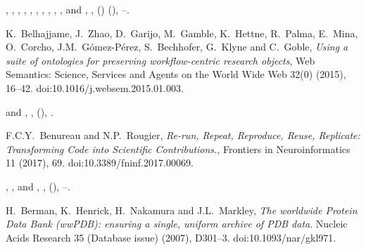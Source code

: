 \documentclass[ds,v1.1.2,openaccess]{iosart2x}%
\begin{document}
\begin{thebibliography}{}
%
\begin{barticle}
,
,
,
,
,
,
,
,
,
,
 and
,
,
()
(),
--.
\end{barticle}
%
\OrigBibText
K.~Belhajjame,
J.~Zhao,
D.~Garijo,
M.~Gamble,
K.~Hettne,
R.~Palma,
E.~Mina,
O.~Corcho,
J.M.~G\'{o}mez-P\'{e}rez,
S.~Bechhofer,
G.~Klyne and
C.~Goble,
\textit{Using a suite of ontologies for preserving workflow-centric research
objects},
Web Semantics: Science, Services and Agents on the World Wide Web
32(0)
(2015),
16--42.
doi:10.1016/j.websem.2015.01.003.
\endOrigBibText
{}
\endbibitem

%
\begin{barticle}
 and
,
,
(),
.
\end{barticle}
%
\OrigBibText
F.C.Y.~Benureau and
N.P.~Rougier,
\textit{Re-run, Repeat, Reproduce, Reuse, Replicate: Transforming Code into
Scientific Contributions.},
Frontiers in Neuroinformatics
11
(2017),
69.
doi:10.3389/fninf.2017.00069.
\endOrigBibText
{}
\endbibitem

%
\begin{barticle}
,
,
 and
,
,
(),
--.
\end{barticle}
%
\OrigBibText
H.~Berman,
K.~Henrick,
H.~Nakamura and
J.L.~Markley,
\textit{The worldwide Protein Data Bank ({wwPDB}): ensuring a single, uniform
archive of {PDB} data}.
Nucleic Acids Research
35 (Database issue)
(2007),
D301--3.
doi:10.1093/nar/gkl971.
\endOrigBibText
{}
\endbibitem


\end{thebibliography}
\end{document}
